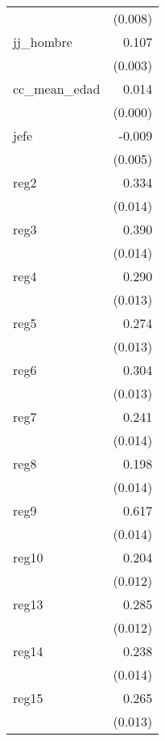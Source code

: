 {\begin{longtable}{l*{1}{D{.}{.}{-1}}}
            &     (0.008)         \\
\addlinespace
jj\_hombre   &       0.107\sym{***}\\
            &     (0.003)         \\
\addlinespace
cc\_mean\_edad&       0.014\sym{***}\\
            &     (0.000)         \\
\addlinespace
jefe        &      -0.009         \\
            &     (0.005)         \\
\addlinespace
reg2        &       0.334\sym{***}\\
            &     (0.014)         \\
\addlinespace
reg3        &       0.390\sym{***}\\
            &     (0.014)         \\
\addlinespace
reg4        &       0.290\sym{***}\\
            &     (0.013)         \\
\addlinespace
reg5        &       0.274\sym{***}\\
            &     (0.013)         \\
\addlinespace
reg6        &       0.304\sym{***}\\
            &     (0.013)         \\
\addlinespace
reg7        &       0.241\sym{***}\\
            &     (0.014)         \\
\addlinespace
reg8        &       0.198\sym{***}\\
            &     (0.014)         \\
\addlinespace
reg9        &       0.617\sym{***}\\
            &     (0.014)         \\
\addlinespace
reg10       &       0.204\sym{***}\\
            &     (0.012)         \\
\addlinespace
reg13       &       0.285\sym{***}\\
            &     (0.012)         \\
\addlinespace
reg14       &       0.238\sym{***}\\
            &     (0.014)         \\
\addlinespace
reg15       &       0.265\sym{***}\\
            &     (0.013)         \\

\end{longtable}}
